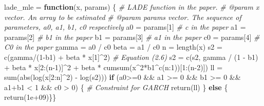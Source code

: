 \documentclass[
  11pt,
]{article}
\newenvironment{Shaded}{\begin{snugshade}}{\end{snugshade}}
\newcommand{\CommentTok}[1]{\textcolor[rgb]{0.56,0.35,0.01}{\textit{#1}}}
\newcommand{\ControlFlowTok}[1]{\textcolor[rgb]{0.13,0.29,0.53}{\textbf{#1}}}
\newcommand{\DecValTok}[1]{\textcolor[rgb]{0.00,0.00,0.81}{#1}}
\newcommand{\FloatTok}[1]{\textcolor[rgb]{0.00,0.00,0.81}{#1}}
\newcommand{\FunctionTok}[1]{\textcolor[rgb]{0.00,0.00,0.00}{#1}}
\newcommand{\NormalTok}[1]{#1}
\newcommand{\OtherTok}[1]{\textcolor[rgb]{0.56,0.35,0.01}{#1}}
\newcommand{\SpecialCharTok}[1]{\textcolor[rgb]{0.00,0.00,0.00}{#1}}
\begin{document}
\begin{Shaded}
\begin{Highlighting}[]
\NormalTok{lade\_mle }\OtherTok{=} \ControlFlowTok{function}\NormalTok{(x, params) \{}
  \CommentTok{\#\textquotesingle{} LADE function in the paper. }
  \CommentTok{\#\textquotesingle{} @param x vector. An array to be estimated}
  \CommentTok{\#\textquotesingle{} @param params vector. The sequence of parameters, a0, a1, b1, c0 respectively}
\NormalTok{  a0 }\OtherTok{=}\NormalTok{ params[}\DecValTok{1}\NormalTok{] }\CommentTok{\# c in the paper}
\NormalTok{  a1 }\OtherTok{=}\NormalTok{ params[}\DecValTok{2}\NormalTok{] }\CommentTok{\# b1 in the paper}
\NormalTok{  b1 }\OtherTok{=}\NormalTok{ params[}\DecValTok{3}\NormalTok{] }\CommentTok{\# a1 in the paper}
\NormalTok{  c0 }\OtherTok{=}\NormalTok{ params[}\DecValTok{4}\NormalTok{] }\CommentTok{\# C0 in the paper}
\NormalTok{  gamma }\OtherTok{=}\NormalTok{ a0 }\SpecialCharTok{/}\NormalTok{ c0}
\NormalTok{  beta }\OtherTok{=}\NormalTok{ a1 }\SpecialCharTok{/}\NormalTok{ c0}
\NormalTok{  n }\OtherTok{=} \FunctionTok{length}\NormalTok{(x)}
\NormalTok{  s2 }\OtherTok{=} \FunctionTok{c}\NormalTok{(gamma}\SpecialCharTok{/}\NormalTok{(}\DecValTok{1}\SpecialCharTok{{-}}\NormalTok{b1) }\SpecialCharTok{+}\NormalTok{ beta }\SpecialCharTok{*}\NormalTok{ x[}\DecValTok{1}\NormalTok{]}\SpecialCharTok{\^{}}\DecValTok{2}\NormalTok{) }\CommentTok{\# Equation (2.6)}
\NormalTok{  s2 }\OtherTok{=} \FunctionTok{c}\NormalTok{(s2, gamma }\SpecialCharTok{/}\NormalTok{ (}\DecValTok{1} \SpecialCharTok{{-}}\NormalTok{ b1) }\SpecialCharTok{+}\NormalTok{ beta }\SpecialCharTok{*}\NormalTok{ x[}\DecValTok{2}\SpecialCharTok{:}\NormalTok{(n}\DecValTok{{-}1}\NormalTok{)]}\SpecialCharTok{\^{}}\DecValTok{2} \SpecialCharTok{+}\NormalTok{ beta }\SpecialCharTok{*} \FunctionTok{cumsum}\NormalTok{(x}\SpecialCharTok{\^{}}\DecValTok{2}\SpecialCharTok{*}\NormalTok{b1}\SpecialCharTok{\^{}}\FunctionTok{c}\NormalTok{(n}\SpecialCharTok{:}\DecValTok{1}\NormalTok{))[}\DecValTok{1}\SpecialCharTok{:}\NormalTok{(n}\DecValTok{{-}2}\NormalTok{)])}
\NormalTok{  ll }\OtherTok{=} \FunctionTok{sum}\NormalTok{(}\FunctionTok{abs}\NormalTok{(}\FunctionTok{log}\NormalTok{(x[}\DecValTok{2}\SpecialCharTok{:}\NormalTok{n]}\SpecialCharTok{\^{}}\DecValTok{2}\NormalTok{) }\SpecialCharTok{{-}} \FunctionTok{log}\NormalTok{(s2)))}
  \ControlFlowTok{if}\NormalTok{ (a0}\SpecialCharTok{\textgreater{}=}\DecValTok{0} \SpecialCharTok{\&\&}\NormalTok{ a1 }\SpecialCharTok{\textgreater{}=} \DecValTok{0} \SpecialCharTok{\&\&}\NormalTok{ b1 }\SpecialCharTok{\textgreater{}=} \DecValTok{0} \SpecialCharTok{\&\&}\NormalTok{ a1}\SpecialCharTok{+}\NormalTok{b1 }\SpecialCharTok{\textless{}} \DecValTok{1} \SpecialCharTok{\&\&}\NormalTok{ c0 }\SpecialCharTok{\textgreater{}} \DecValTok{0}\NormalTok{) \{ }\CommentTok{\# Constraint for GARCH}
    \FunctionTok{return}\NormalTok{(ll)}
\NormalTok{  \} }\ControlFlowTok{else}\NormalTok{ \{}
    \FunctionTok{return}\NormalTok{(}\FloatTok{1e+09}\NormalTok{)\}\}}


\end{Highlighting}
\end{Shaded}
\end{document}

